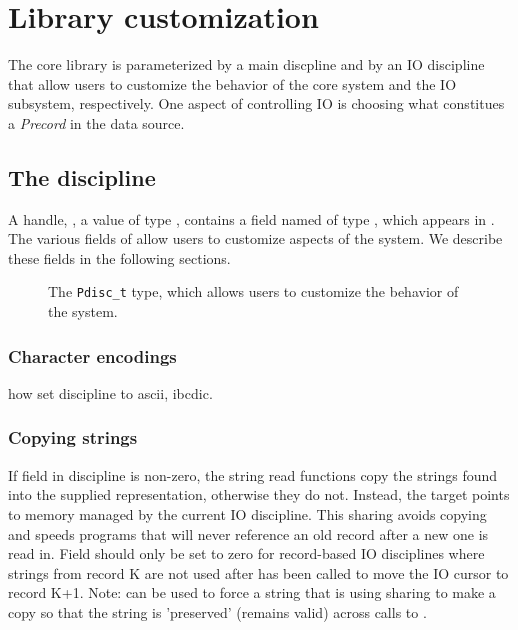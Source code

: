 \chapter{Library customization}
\label{chap:library-customization}
The \pads{} core library is parameterized by a main discpline and by
an IO discipline that allow users to customize the behavior of the
core system and the IO subsystem, respectively.  One aspect of
controlling IO is choosing what constitues a \textit{Precord} in the
data source.

\section{The \pads{} discipline}
A \pads{} handle, \ie{}, a value of type , contains a field
named  of type , which appears in
. The various fields of  allow users to
customize aspects of the \pads{} system.  We describe these fields in
the following sections.

\begin{figure}
\caption{The \texttt{Pdisc\_t} type, which allows users to customize the
  behavior of the \pads{} system.}
\label{fig:pdisc}
\end{figure}

\subsection{Character encodings}
\label{sec:library-customization-character-encodings}
how set discipline to ascii, ibcdic.

\subsection{Copying strings} 
\label{sec:library-customization-copy-strings}
 If  field in \pads{} discipline is non-zero, the string read functions
 copy the strings found into the supplied representation, otherwise they do not.
 Instead, the target  points to memory managed by the current
 IO discipline.  This sharing avoids copying and speeds programs that
 will never reference an old record after a new one is read in.
Field  should only be set to zero for record-based IO disciplines where
strings from record K are not used after  has been called to move
the IO cursor to record K+1.  Note:  can be used to
force a string that is using sharing to make a copy so that the string is 'preserved'
(remains valid) across calls to .

